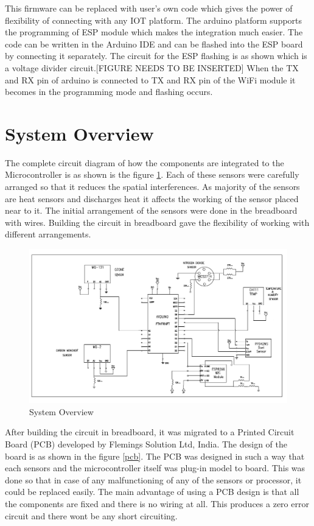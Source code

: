  This firmware can be replaced with user's own code which gives the power of flexibility of connecting with any IOT platform. The arduino platform supports the programming of ESP module which makes the integration much easier. The code can be written in the Arduino IDE and can be flashed into the ESP board by connecting it separately.
 The circuit for the ESP flashing is as shown which is a voltage divider circuit.[FIGURE NEEDS TO BE INSERTED] When the TX and RX pin of arduino is connected to TX and RX pin of the WiFi module it becomes in the programming mode and flashing occurs. 
 
 \section{System Overview}
The complete circuit diagram of how the components are integrated to the Microcontroller is as shown is the figure \ref{system}. Each of these sensors were carefully arranged so that it reduces the spatial interferences. As majority of the sensors are heat sensors and discharges heat it affects the working of the sensor placed near to it. The initial arrangement of the sensors were done in the breadboard with wires. Building the circuit in breadboard gave the flexibility of working with different arrangements.

 \begin{figure}[h]
  \begin{center}
  \includegraphics[scale=0.95]{./images/figure5.png}
  \end{center}
  \caption{System Overview}
  \label{system}
\end{figure}

After building the circuit in breadboard, it was migrated to a Printed Circuit Board (PCB) developed by Flemings Solution Ltd, India. The design of the board is as shown in the figure \ref{pcb}. The PCB was designed in such a way that each sensors and the microcontroller itself was plug-in model to board. This was done so that in case of any malfunctioning of any of the sensors or processor, it could be replaced easily. The main advantage of using a PCB design is that all the components are fixed and there is no wiring at all. This produces a zero error circuit and there wont be any short circuiting.



